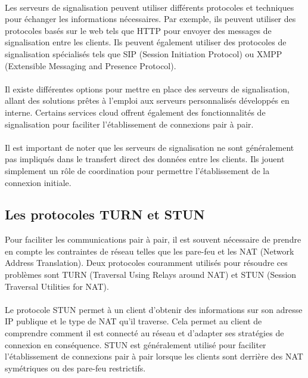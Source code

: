 \paragraph{}
Les serveurs de signalisation peuvent utiliser différents protocoles et techniques pour échanger les informations nécessaires. Par exemple, ils peuvent utiliser des protocoles basés sur le web tels que HTTP pour envoyer des messages 
de signalisation entre les clients. Ils peuvent également utiliser des protocoles de signalisation spécialisés tels que SIP (Session Initiation Protocol) ou XMPP (Extensible Messaging and Presence Protocol).

\paragraph{}
Il existe différentes options pour mettre en place des serveurs de signalisation, allant des solutions prêtes à l'emploi aux serveurs personnalisés développés en interne. Certains services cloud offrent également des 
fonctionnalités de signalisation pour faciliter l'établissement de connexions pair à pair.

\paragraph{}
Il est important de noter que les serveurs de signalisation ne sont généralement pas impliqués dans le transfert direct des données entre les clients. Ils jouent simplement un rôle de coordination pour permettre 
l'établissement de la connexion initiale.

\newpage
\subsection{Les protocoles TURN et STUN}

Pour faciliter les communications pair à pair, il est souvent nécessaire de prendre en compte les contraintes de réseau telles que les pare-feu et les NAT (Network Address Translation). Deux protocoles couramment utilisés pour résoudre ces 
problèmes sont TURN (Traversal Using Relays around NAT) et STUN (Session Traversal Utilities for NAT).

\paragraph{}
Le protocole STUN permet à un client d'obtenir des informations sur son adresse IP publique et le type de NAT qu'il traverse. Cela permet au client de comprendre comment il est connecté au réseau et d'adapter ses stratégies de 
connexion en conséquence. STUN est généralement utilisé pour faciliter l'établissement de connexions pair à pair lorsque les clients sont derrière des NAT symétriques ou des pare-feu restrictifs.

